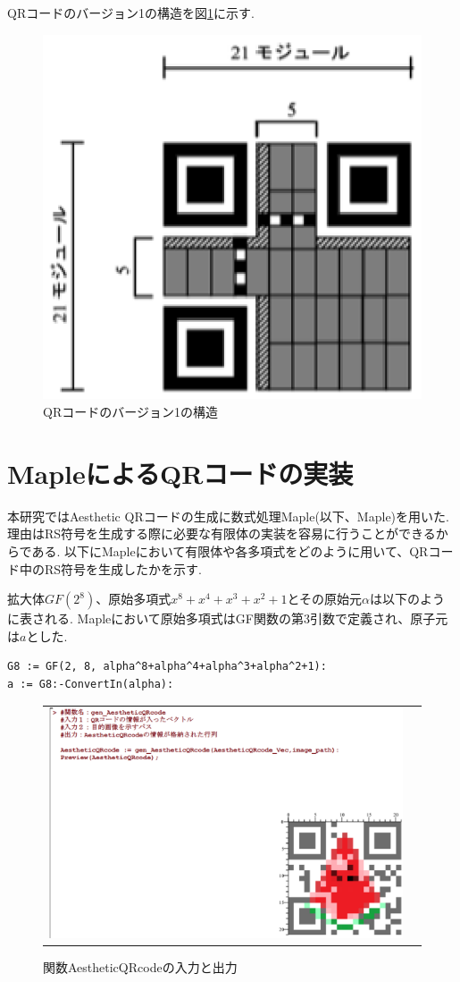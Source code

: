 \documentclass{thesis}
\begin{document}
QRコードのバージョン1の構造を図\ref{v1}に示す.

\begin{figure}[H]
      \centering
      \includegraphics[width=0.5\linewidth]{pic/v1.eps}
      \caption{QRコードのバージョン1の構造}
      \label{v1}
\end{figure}

\section{MapleによるQRコードの実装}

本研究ではAesthetic QRコードの生成に数式処理Maple(以下、Maple)を用いた.理由はRS符号を生成する際に必要な有限体の実装を容易に行うことができるからである.
以下にMapleにおいて有限体や各多項式をどのように用いて、QRコード中のRS符号を生成したかを示す.

拡大体$GF(2^8)$、原始多項式$x^{8}+x^{4}+x^{3}+x^{2}+1$とその原始元$\alpha$は以下のように表される.
Mapleにおいて原始多項式はGF関数の第3引数で定義され、原子元は$a$とした.
\begin{lstlisting}
G8 := GF(2, 8, alpha^8+alpha^4+alpha^3+alpha^2+1):
a := G8:-ConvertIn(alpha):
\end{lstlisting}

\begin{figure}[H]
  \begin{tabular}{cc}
    \begin{minipage}[t]{0,9\hsize}
      \centering
      \includegraphics[width=1\linewidth]{pic/AestheticQRcode.eps}
      \caption{関数AestheticQRcodeの入力と出力}
      \label{AestheticQRcode_function}
    \end{minipage} 
  \end{tabular}
\end{figure}
\end{document}
